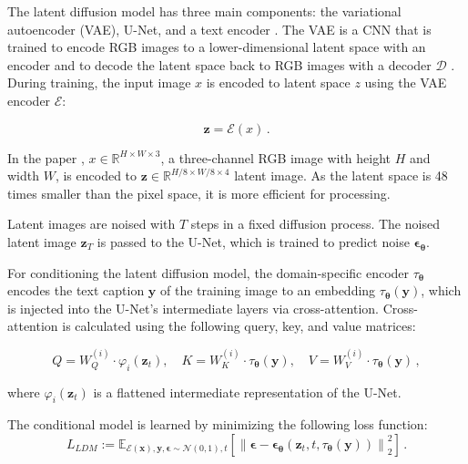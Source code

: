The latent diffusion model has three main components: the variational autoencoder (VAE), U-Net, and a text encoder \cite{rombach2022highresolutionimagesynthesislatent}. The VAE is a CNN that is trained to encode RGB images to a lower-dimensional latent space with an encoder and to decode the latent space back to RGB images with a decoder $\mathcal{D}$ \cite{esser2021tamingtransformershighresolutionimage}. During training, the input image $x$ is encoded to latent space $z$ using the VAE encoder $\mathcal{E}$:

\begin{equation}
\mathbf{z}=\mathcal{E}(x) \,.
\end{equation}

In the paper \cite{rombach2022highresolutionimagesynthesislatent}, $x \in \mathbb{R}^{H \times W \times 3}$, a three-channel RGB image with height $H$ and width $W$, is encoded to $\mathbf{z} \in \mathbb{R}^{H/8 \times W/8 \times 4}$ latent image. As the latent space is 48 times smaller than the pixel space, it is more efficient for processing.

Latent images are noised with $T$ steps in a fixed diffusion process. The noised latent image $\mathbf{z}_T$ is passed to the U-Net, which is trained to predict noise $\boldsymbol{\epsilon}_{\boldsymbol{\theta}}$. \cite{rombach2022highresolutionimagesynthesislatent}

For conditioning the latent diffusion model, the domain-specific encoder $\tau_{\boldsymbol{\theta}}$ encodes the text caption $\mathbf{y}$ of the training image to an embedding $\tau_{\boldsymbol{\theta}}(\mathbf{y})$, which is injected into the U-Net's intermediate layers via cross-attention. Cross-attention is calculated using the following query, key, and value matrices:

\begin{equation}
    Q=W_{Q}^{(i)} \cdot \varphi_{i}\left(\mathbf{z}_{t}\right),\quad K=W_{K}^{(i)} \cdot \tau_{\boldsymbol{\theta}}(\mathbf{y}),\quad V=W_{V}^{(i)} \cdot \tau_{\boldsymbol{\theta}}(\mathbf{y}) \,,
\end{equation}

where $\varphi_{i}\left(\mathbf{z}_{t}\right)$ is a flattened intermediate representation of the U-Net. \cite{rombach2022highresolutionimagesynthesislatent}

The conditional model is learned by minimizing the following loss function:
\begin{equation}
L_{L D M}:=\mathbb{E}_{\mathcal{E}(\mathbf{x}), \mathbf{y}, \boldsymbol{\epsilon} \sim \mathcal{N}(0,1), t}\left[\left\|\boldsymbol{\epsilon}-\boldsymbol{\epsilon}_{\boldsymbol{\theta}}\left(\mathbf{z}_{t}, t, \tau_{\boldsymbol{\theta}}(\mathbf{y})\right)\right\|_{2}^{2}\right] \,.
\label{eq:ldm_loss}
\end{equation}


